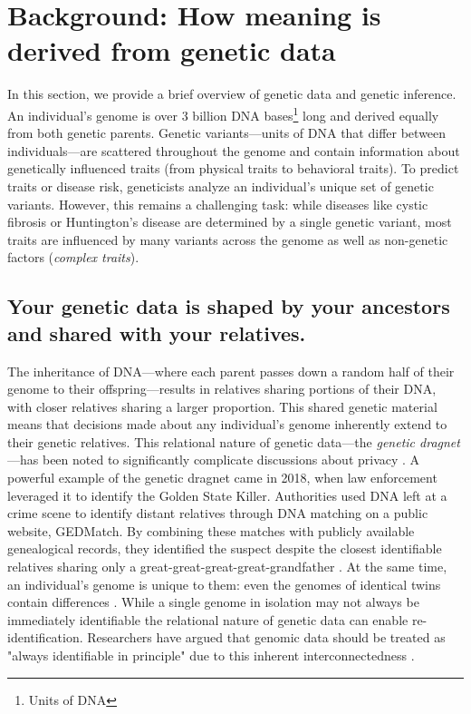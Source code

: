 \section{Background: How meaning is derived from genetic data}
\label{section:genetic_data}
In this section, we provide a brief overview of genetic data and genetic inference. An individual's genome is over 3 billion DNA bases\footnote{Units of DNA} long and derived equally from both genetic parents. Genetic variants—units of DNA that differ between individuals—are scattered throughout the genome and contain information about genetically influenced traits (from physical traits to behavioral traits). To predict traits or disease risk, geneticists analyze an individual's unique set of genetic variants. However, this remains a challenging task: while diseases like cystic fibrosis or Huntington's disease are determined by a single genetic variant, most traits are influenced by many variants across the genome as well as non-genetic factors (\emph{complex traits}).

\subsection{Your genetic data is shaped by your ancestors and shared with your relatives.}

The inheritance of DNA—where each parent passes down a random half of their genome to their offspring—results in relatives sharing portions of their DNA, with closer relatives sharing a larger proportion. This shared genetic material means that decisions made about any individual's genome inherently extend to their genetic relatives. This relational nature of genetic data—the \emph{genetic dragnet}—has been noted to significantly complicate discussions about privacy \cite{costello_genetic_2022}. A powerful example of the genetic dragnet came in 2018, when law enforcement leveraged it to identify the Golden State Killer. Authorities used DNA left at a crime scene to identify distant relatives through DNA matching on a public website, GEDMatch. By combining these matches with publicly available genealogical records, they identified the suspect despite the closest identifiable relatives sharing only a great-great-great-great-grandfather \cite{kaiser_we_2018, zabel_killer_2019}. At the same time, an individual's genome is unique to them: even the genomes of identical twins contain differences \cite{ormond_whole_2024}. While a single genome in isolation may not always be immediately identifiable the relational nature of genetic data can enable re-identification. Researchers have argued that genomic data should be treated as "always identifiable in principle" due to this inherent interconnectedness \cite{shabani_reidentifiability_2019, bonomi_privacy_2020}.

